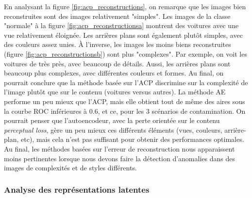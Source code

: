 En analysant la figure \ref{fig:acp_reconstructions}, on remarque que les images bien reconstruites sont des images relativement "simples". Les images de la classe "normale" à la figure \ref{fig:acp_reconstructionsa} montrent des voitures avec une vue relativement éloignée. Les arrières plans sont également plutôt simples, avec des couleurs assez unies. À l'inverse, les images les moins biens reconstruites (figure \ref{fig:acp_reconstructionsb}) sont plus "complexes". Par exemple, on voit les voitures de très près, avec beaucoup de détails. Aussi, les arrières plans sont beaucoup plus complexes, avec différentes couleurs et formes. Au final, on pourrait conclure que la méthode basée sur l'ACP discrimine sur la complexité de l'image plutôt que sur le contenu (voitures versus autres). La méthode AE performe un peu mieux que l'ACP, mais elle obtient tout de même des aires sous la courbe ROC inférieures à 0.6, et ce, pour les 3 scénarios de contamination. On pourrait penser que l'autoencodeur, avec la perte orientée sur le contenu \textit{perceptual loss}, gère un peu mieux ces différents éléments (vues, couleurs, arrière-plan, etc), mais cela n'est pas suffisant pour obtenir des performances optimales. Au final, les méthodes basées sur l'erreur de reconstruction nous apparaissent moins pertinentes lorsque nous devons faire la détection d'anomalies dans des images de complexités et de styles différents.


\subsubsection{Analyse des représentations latentes} \label{analyse_lat_cars}


